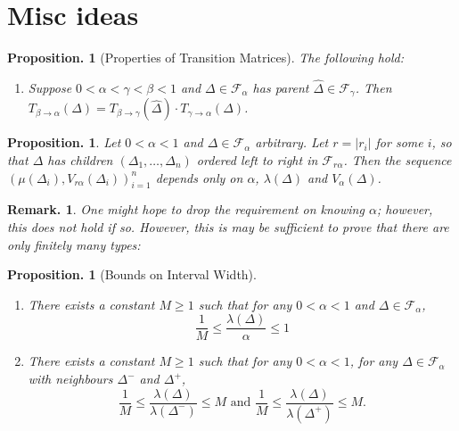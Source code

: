 \documentclass[11pt, a4paper]{memoir}
\theoremstyle{change}
\newtheorem{proposition}[theorem]{Proposition.}
\theoremstyle{plain}
\theoremstyle{nonumberplain}
\newtheorem{remark}{Remark.}
\numberwithin{equation}{section}
\begin{document}
\section{Misc ideas}
\begin{proposition}[Properties of Transition Matrices]
    The following hold:
    \begin{enumerate}[nl,r]
        \item Suppose $0<\alpha<\gamma<\beta<1$ and $\Delta\in\mathcal{F}_\alpha$ has parent $\widehat\Delta\in\mathcal{F}_\gamma$.
            Then $T_{\beta\to\alpha}(\Delta)=T_{\beta\to\gamma}(\widehat\Delta)\cdot T_{\gamma\to\alpha}(\Delta)$.
    \end{enumerate}
\end{proposition}
\begin{proposition}
    Let $0<\alpha<1$ and $\Delta\in\mathcal{F}_\alpha$ arbitrary.
    Let $r=|r_i|$ for some $i$, so that $\Delta$ has children $(\Delta_1,\ldots,\Delta_n)$ ordered left to right in $\mathcal{F}_{r\alpha}$.
    Then the sequence $(\mu(\Delta_i),V_{r\alpha}(\Delta_i))_{i=1}^n$ depends only on $\alpha$, $\lambda(\Delta)$ and $V_\alpha(\Delta)$.
\end{proposition}
\begin{remark}
    One might hope to drop the requirement on knowing $\alpha$; however, this does not hold if so.
    However, this is may be sufficient to prove that there are only finitely many types:
\end{remark}
\begin{proposition}[Bounds on Interval Width]
    \begin{enumerate}[nl,r]
        \item There exists a constant $M\geq 1$ such that for any $0<\alpha<1$ and $\Delta\in\mathcal{F}_\alpha$, \begin{equation*} \frac{1}{M}\leq \frac{\lambda(\Delta)}{\alpha}\leq 1 \end{equation*}
        \item There exists a constant $M\geq 1$ such that for any $0<\alpha<1$, for any $\Delta\in\mathcal{F}_\alpha$ with neighbours $\Delta^-$ and $\Delta^+$,
            \begin{equation*}
                \frac{1}{M}\leq \frac{\lambda(\Delta)}{\lambda(\Delta^-)}\leq M\text{ and } \frac{1}{M}\leq \frac{\lambda(\Delta)}{\lambda(\Delta^+)}\leq M.
            \end{equation*}
    \end{enumerate}
\end{proposition}
\end{document}
